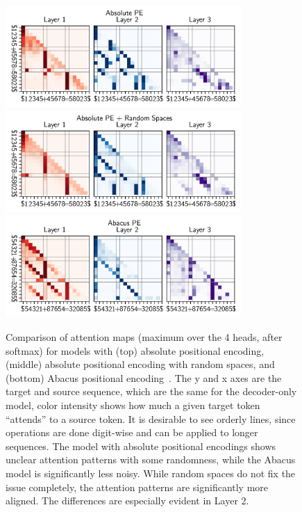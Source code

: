 \begin{figure}[!h]
    \centering
    \includegraphics[width=0.8\textwidth]{fig/attn_map_abs_pe.png}
    \includegraphics[width=0.8\textwidth]{fig/attn_map_abs_pe_random_spaces.png}
    \includegraphics[width=0.8\textwidth]{fig/attn_map_abacus_pe.png}
    \caption{Comparison of attention maps (maximum over the 4 heads, after softmax) for models with (top) absolute positional encoding, (middle) absolute positional encoding with random spaces, and (bottom) Abacus positional encoding~\parencite{mcleish_transformers_2024}. The y and x axes are the target and source sequence, which are the same for the decoder-only model, color intensity shows how much a given target token ``attends'' to a source token. It is desirable to see orderly lines, since operations are done digit-wise and can be applied to longer sequences. The model with absolute positional encodings shows unclear attention patterns with some randomness, while the Abacus model is significantly less noisy. While random spaces do not fix the issue completely, the attention patterns are significantly more aligned. The differences are especially evident in Layer 2.}
    \label{fig:digit_align_attn_maps}
\end{figure}


